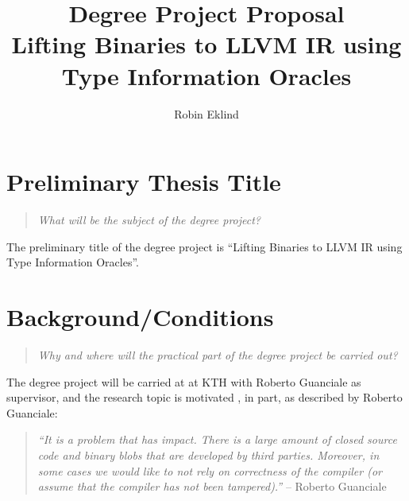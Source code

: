 \documentclass[12pt, a4paper]{article}
\title{Degree Project Proposal \\ \Large Lifting Binaries to LLVM IR using Type Information Oracles}
\author{Robin Eklind \\ }
\begin{document}



\maketitle

\clearpage


\tableofcontents

\clearpage



\section{Preliminary Thesis Title}

\begin{quote}
	\textit{What will be the subject of the degree project?}
\end{quote}

The preliminary title of the degree project is ``Lifting Binaries to LLVM IR using Type Information Oracles''.

\section{Background/Conditions}

\begin{quote}
	\textit{Why and where will the practical part of the degree project be carried out?}
\end{quote}

The degree project will be carried at at KTH with Roberto Guanciale as supervisor, and the research topic is motivated , in part, as described by Roberto Guanciale:

\begin{quote}
	\textit{``It is a problem that has impact. There is a large amount of closed source code and binary blobs that are developed by third parties. Moreover, in some cases we would like to not rely on correctness of the compiler (or assume that the compiler has not been tampered).''} -- Roberto Guanciale
\end{quote}
\end{document}
